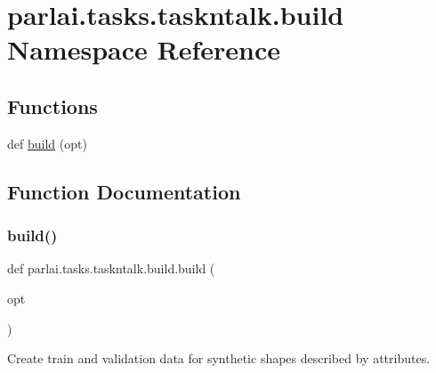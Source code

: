 \hypertarget{namespaceparlai_1_1tasks_1_1taskntalk_1_1build}{}\section{parlai.\+tasks.\+taskntalk.\+build Namespace Reference}
\label{namespaceparlai_1_1tasks_1_1taskntalk_1_1build}
\subsection*{Functions}
\begin{DoxyCompactItemize}
\item 
def \hyperlink{namespaceparlai_1_1tasks_1_1taskntalk_1_1build_a92a0de8038feadf9e3980d7ad49f2083}{build} (opt)
\end{DoxyCompactItemize}


\subsection{Function Documentation}
\mbox{\label{namespaceparlai_1_1tasks_1_1taskntalk_1_1build_a92a0de8038feadf9e3980d7ad49f2083}} 
\subsubsection{\texorpdfstring{build()}{build()}}
{\footnotesize\ttfamily def parlai.\+tasks.\+taskntalk.\+build.\+build (\begin{DoxyParamCaption}\item[{}]{opt }\end{DoxyParamCaption})}

\begin{DoxyVerb}Create train and validation data for synthetic shapes described by attributes.
\end{DoxyVerb}
 